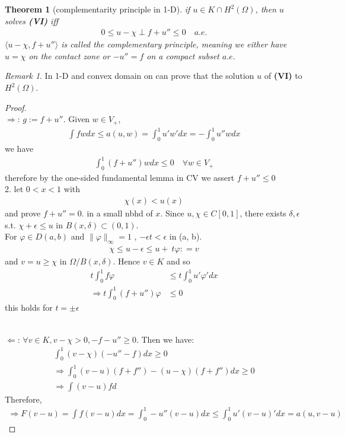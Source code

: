 \documentclass[a4paper,12pt,oneside,fleqn]{book}
\newtheorem{theorem}{Theorem}[section]
\theoremstyle{definition}
\theoremstyle{remark}
\newtheorem*{remark}{Remark}
\begin{document}
\begin{theorem}[complementarity principle in 1-D]
	if $u \in K \cap H^2(\Omega)$, then $u$ solves \textbf{(VI)} iff
	\begin{align*}
		0 \le u - \chi \perp f + u'' \le 0 \quad a.e.
	\end{align*}
	$\langle u - \chi, f + u''\rangle$ is called the complementary principle, meaning we either have $u = \chi$ on the contact zone or $- u'' = f$ on a compact subset $a.e.$
\end{theorem}
\begin{remark}
In 1-D and convex domain on can prove that the solution $u$ of \textbf{(VI)} to $H^2(\Omega)$. 	
\end{remark}
\begin{proof}\quad\\
$\Rightarrow$:
	$g := f + u''$.  Given $w \in V_+$, 	
	\begin{align*}
		\int f w dx  \le a(u,w)
		= \int_0^1 u'w' dx 
		= - \int_0^1 u'' w dx 
	\end{align*}
	we have
	\begin{align*}
		\int_0^1 (f + u'')w dx \le 0 \quad \forall w \in V_+
	\end{align*}
	therefore by the one-sided fundamental lemma in CV we assert $f + u'' \le 0$ \\
	2. let $0 < x < 1$ with 
	\begin{align*}
		\chi(x) < u(x)
	\end{align*}
	and prove $f + u'' = 0$. in a small nbhd of $x$. Since $u, \chi \in C[0, 1]$, there exists $\delta, \epsilon$ s.t. $\chi + \epsilon \le u$ in $B(x, \delta) \subset (0, 1)$. \\
	For $\varphi \in D(a, b)$ and $\|\varphi\|_\infty = 1$ , $-\epsilon t < \epsilon$ in (a, b).
	\begin{align*}
		\chi \le u - \epsilon \le u +\ t\varphi: = v
	\end{align*}
	and $v = u \ge \chi$ in $\Omega \slash B(x, \delta)$. Hence $v \in K$ and so
	\begin{align*}
		t \int_0^1 f\varphi &\le t \int_0^1 u'\varphi'dx\\
		\Rightarrow t \int_0^1 (f + u'')\varphi &\le 0
	\end{align*}
	this holds for $t = \pm\epsilon$
	
	\quad\\
	$\Leftarrow$: $\forall v \in K,  v - \chi > 0, - f - u'' \ge 0$. Then we have:
	\begin{align*}
		\int_0^1 (v - \chi) (- u''- f) dx \ge 0\\
		\Rightarrow \int_0^1 (v - u) (f + f'') - (u - \chi)(f + f'') dx \ge 0\\
		\Rightarrow \int (v - u) f d 
	\end{align*}
	Therefore, 
	\begin{align*}
		\Rightarrow F(v - u) = \int f(v - u) dx  = \int_0^1 - u''(v - u)dx \le  \int_0^1 u'(v - u)'dx = a(u, v - u)
	\end{align*}
\end{proof}
\end{document}

